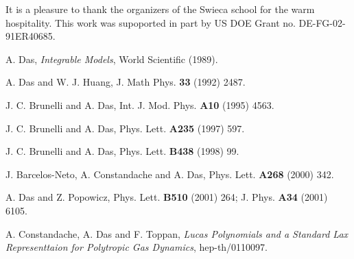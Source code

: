 \documentclass[a4paper,11pt]{article}
\begin{document}
It is a pleasure to thank the organizers of the Swieca school for the
warm hospitality. This work was supoported in part by US DOE Grant
no. DE-FG-02-91ER40685.


\begin{thebibliography}{99}

 A. Das, {\em Integrable Models}, World Scientific (1989).

 A. Das and W. J. Huang, J. Math Phys. {\bf 33} (1992)
2487.

 J. C. Brunelli and A. Das, Int. J. Mod. Phys. {\bf A10}
(1995) 4563.

 J. C. Brunelli and A. Das, Phys. Lett. {\bf A235} (1997)
597.

 J. C. Brunelli and A. Das, Phys. Lett. {\bf B438} (1998)
99.

 J. Barcelos-Neto, A. Constandache and A. Das,
Phys. Lett. {\bf A268} (2000) 342.

 A. Das and Z. Popowicz, Phys. Lett. {\bf B510} (2001) 264;
J. Phys. {\bf A34} (2001) 6105.

 A. Constandache, A. Das and F. Toppan, {\em Lucas
Polynomials and a Standard Lax Representtaion for Polytropic Gas
Dynamics},  hep-th/0110097.

\end{thebibliography}
\end{document}
